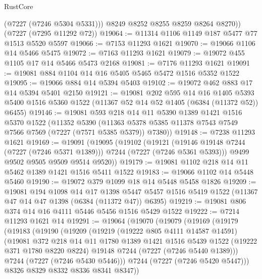 \begin{lexlean}{RustCore}
\begin{coremodule}
          (@7227 (@7246 @5304 @5331)))
        @8249
        @8252
        @8255
        @8259
        @8264
        @8270))
    (@7227 (@7295 @11292 @72))
@19064 := @11314 @1106 @1149 @187 @5477 @77 @1513 @5520 @5597
@19066 := @7153 @11293 @1621
@19070 := @19066 @1106 @14 @5466 @5475
@19072 := @7163 @11293 @1621
@19079 := @19072 @455 @1105 @17 @14 @5466 @5473 @2168
@19081 := @7176 @11293 @1621
@19091 := @19081 @884 @1104 @14 @16 @5405 @5465 @5472 @1516 @5352 @1522
@19095 := @19066 @884 @14 @5394 @5403
@19102 := @19072 @462 @883 @17 @14 @5394 @5401 @2150
@19121 := @19081
    @202
    @595
    @14
    @16
    @1405
    @5393
    @5400
    @1516
    @5360
    @1522
    (@11367 @52 @14 @52 @1405 (@6384 (@11372 @52)) @6455)
@19146 := @19081
    @593
    @218
    @14
    @11
    @5390
    @1389
    @1421
    @1516
    @5370
    @1522
    (@11352
      @5390
      (@11363 @5378 @5385 @11378 @7543 @7549 @7566 @7569 (@7227 (@7571 @5385 @5379)) @7380))
@19148 := @7238 @11293 @1621
@19169 := @19091
    (@19095
      (@19102
        (@19121 (@19146 @19148 @7244 (@7227 (@7246 @5371 @1389))) @7244 (@7227 (@7246 @5361 @5393)))
        @9499
        @9502
        @9505
        @9509
        @9514
        @9520))
@19179 := @19081 @1102 @218 @14 @11 @5462 @1389 @1421 @1516 @5411 @1522
@19183 := @19066 @1102 @14 @5448 @5460
@19190 := @19072 @379 @1099 @18 @14 @5448 @5458 @1826
@19209 := @19081
    @194
    @1098
    @14
    @17
    @1398
    @5447
    @5457
    @1516
    @5419
    @1522
    (@11367 @47 @14 @47 @1398 (@6384 (@11372 @47)) @6395)
@19219 := @19081 @806 @374 @14 @16 @4111 @5446 @5456 @1516 @5429 @1522
@19222 := @7214 @11293 @1621 @14
@19291 := @19064
    (@19070
      (@19079
        (@19169
          (@19179
            (@19183
              (@19190
                (@19209
                  (@19219
                    (@19222 @805 @4111 @14587 @14591)
                    (@19081
                      @372
                      @218
                      @14
                      @11
                      @1780
                      @1389
                      @1421
                      @1516
                      @5439
                      @1522
                      (@19222 @371 @1780 @8220 @8224)
                      @19148
                      @7244
                      (@7227 (@7246 @5440 @1389)))
                    @7244
                    (@7227 (@7246 @5430 @5446)))
                  @7244
                  (@7227 (@7246 @5420 @5447)))
                @8326
                @8329
                @8332
                @8336
                @8341
                @8347))

\end{coremodule}
\end{lexlean}
